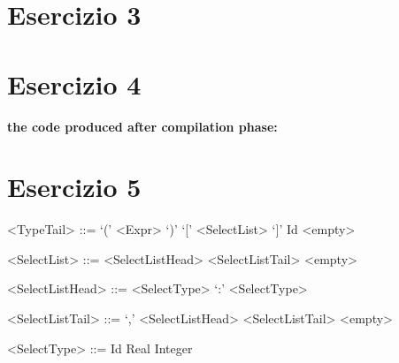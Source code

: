 \documentclass[10pt]{article}
\begin{document}
\section*{Esercizio 3}

\section*{Esercizio 4}


\textbf{the code produced after compilation phase:}

\section*{Esercizio 5}
\begin{grammar}
<TypeTail>	::=	`('	<Expr>	`)'
\alt			`[' <SelectList>	`]' Id	
\alt	<empty>

<SelectList>	::=	<SelectListHead>	<SelectListTail>
\alt	<empty>

<SelectListHead>	::=	<SelectType>	`:'	<SelectType>

<SelectListTail>	::=	`,'	<SelectListHead>	<SelectListTail>	
\alt	<empty>

<SelectType>	::=	Id		
\alt 		Real	
\alt		Integer	

\end{grammar}


 
\end{document}
